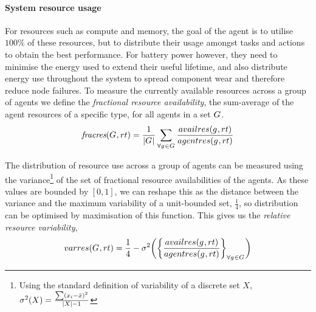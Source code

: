 \paragraph{System resource usage}
\newcommand{\functionResourceAvailableSymbol}[2]{
	\functionSymbol{\textit{fracres}}}
\newcommand{\functionResourceAvailable}[2]{
	\functionSignature{\functionResourceAvailableSymbol{}{}}
	{\setAgents{}{}, \varResourceType{}{}}
}
\newcommand{\functionTaskPathEnergyAvailable}[2]{
	\functionSignature{\functionResourceAvailableSymbol{}{}}
	{\functionTaskArc{}{}, \varResourceTypeEnergy{}{}}
}
\newcommand{\functionResourceVariabilitySymbol}[2]{\functionSymbol{varres}{#1}{#2}}
\newcommand{\functionResourceVariability}[2]{
	\functionSignature{\functionResourceVariabilitySymbol{}{}}
	{\setAgents{}{}, \varResourceType{}{}}
}

\newcommand{\functionTaskPathEnergyVariability}[2]{
	\functionSignature{\functionResourceVariabilitySymbol{}{}}
	{\functionTaskArc{}{}, \varResourceTypeEnergy{}{}}
}
For resources such as compute and memory, the goal of the agent is to utilise $100\%$ of these resources, but to distribute their usage amongst tasks and actions to obtain the best performance. For battery power however, they need to minimise the energy used to extend their useful lifetime, and also distribute energy use throughout the system to spread component wear and therefore reduce node failures. To measure the currently available resources across a group of agents we define the \textit{fractional resource availability}, the sum-average of the agent resources of a specific type, for all agents in a set $G_{}^{}$.
\begin{equation}
	\functionResourceAvailable{}{} 
	= \frac{1}{\funcSize{\setAgents{}{}}}
		\sum_{\forall \varAgent{}{} \in \setAgents{}{}} 
		\frac
		{\functionAgentAvailableResources{}{}}
		{\functionAgentResources{}{}}
\end{equation}

The distribution of resource use across a group of agents can be measured using the variance\footnote{Using the standard definition of variability of a discrete set $X$, $\sigma^2(X) = \frac{\sum (x_i - \bar{x})^2}{\lvert X \rvert-1}$} of the set of fractional resource availabilities of the agents. As these values are bounded by $[0, 1]$, we can reshape this as the distance between the variance and the maximum variability of a unit-bounded set, $\frac{1}{4}$, so distribution can be optimised by maximisation of this function. This gives us the \textit{relative resource variability},
\begin{equation}     	
	\functionResourceVariability{}{} 
	= \frac{1}{4} - \sigma^2 
	\bigg(
	\bigg\lbrace \frac
		{\functionAgentAvailableResources{}{}}
		{\functionAgentResources{}{}}
	\bigg\rbrace_{\forall \varAgent{}{} \in \setAgents{}{}}
	\bigg)
\end{equation}



